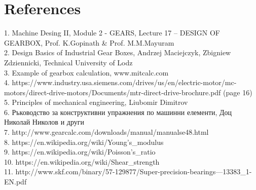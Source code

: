 \documentclass{article}
\begin{document}
\section{References}
1. Machine Desing II, Module 2 - GEARS, Lecture 17 – DESIGN OF GEARBOX, Prof. K.Gopinath \& Prof. M.M.Mayuram \\
2. Design Basics of Industrial Gear Boxes, Andrzej Maciejczyk, Zbigniew Zdziennicki, Technical University of Lodz \\
3. Example of gearbox calculation, www.mitcalc.com \\
4. https://www.industry.usa.siemens.com/drives/us/en/electric-motor/mc-motors/direct-drive-motors/Documents/mtr-direct-drive-brochure.pdf  (page 16) \\
5. Principles of mechanical engineering, Liubomir Dimitrov  \\
6. Ръководство за конструктивни упражнения по машинни елементи, Доц Николай Николов и други  \\
7. http://www.gearcalc.com/downloads/manual/manualse48.html  \\
8. https://en.wikipedia.org/wiki/Young's\_modulus \\
9. https://en.wikipedia.org/wiki/Poisson's\_ratio \\
10. https://en.wikipedia.org/wiki/Shear\_strength \\
11. http://www.skf.com/binary/57-129877/Super-precision-bearings---13383\_1-EN.pdf \\

\tableofcontents
\end{document}
